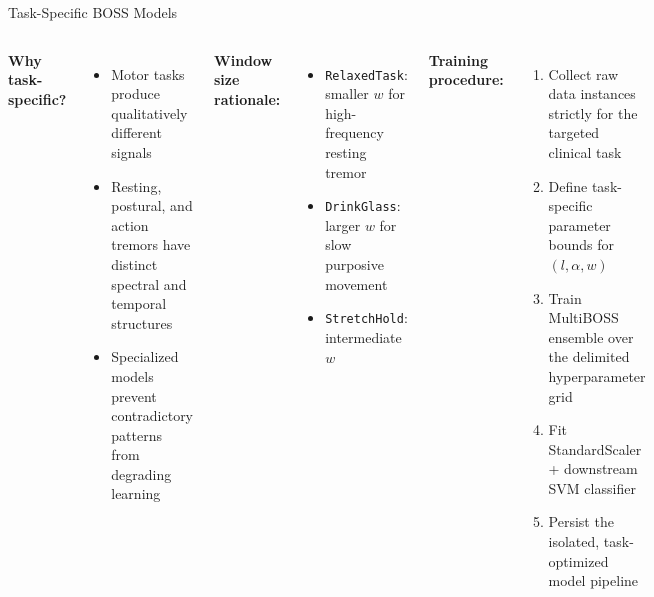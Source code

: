 \documentclass[aspectratio=169, 11pt]{beamer}
\begin{document}
\begin{frame}{Task-Specific BOSS Models}
  \begin{columns}[T]
      \footnotesize
      \textbf{Why task-specific?}
      \begin{itemize}
        \item Motor tasks produce qualitatively different signals
        \item Resting, postural, and action tremors have distinct spectral and temporal structures
        \item Specialized models prevent contradictory patterns from degrading learning
      \end{itemize}
      \vspace{0.2em}
      \textbf{Window size rationale:}
      \begin{itemize}
        \item \texttt{RelaxedTask}: smaller $w$ for high-frequency resting tremor
        \item \texttt{DrinkGlass}: larger $w$ for slow purposive movement
        \item \texttt{StretchHold}: intermediate $w$
      \end{itemize}
      \footnotesize
      \textbf{Training procedure:}
      \begin{enumerate}
        \item Collect raw data instances strictly for the targeted clinical task
        \item Define task-specific parameter bounds for $(l, \alpha, w)$
        \item Train MultiBOSS ensemble over the delimited hyperparameter grid
        \item Fit StandardScaler + downstream SVM classifier
        \item Persist the isolated, task-optimized model pipeline
      \end{enumerate}
  \end{columns}
\end{frame}
\end{document}
